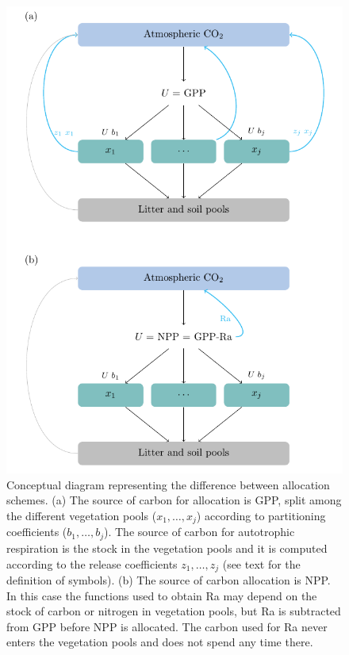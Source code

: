 \documentclass[bg, manuscript]{copernicus}
\begin{document}
\begin{figure}[t]
   \centering
   \includegraphics{Fig1_conceptualDiagram.pdf} %
   \caption{Conceptual diagram representing the difference between allocation schemes. (a) The source of carbon for allocation is GPP, split among the different vegetation pools ($x_1, \dots , x_j$) according to partitioning coefficients ($b_1, \dots , b_j$). The source of carbon for autotrophic respiration is the stock in the vegetation pools and it is computed according to the release coefficients $z_1, \dots , z_j$ (see text for the definition of symbols). (b) The source of carbon allocation is NPP. In this case the functions used to obtain Ra may depend on the stock of carbon or nitrogen in vegetation pools, but Ra is subtracted from GPP before NPP is allocated. The carbon used for Ra never enters the vegetation pools and does not spend any time there.}
   \label{fig:concept}
\end{figure}
\end{document}
